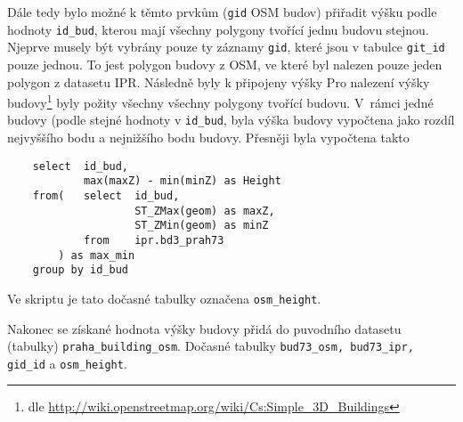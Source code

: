 Dále tedy bylo možné k těmto prvkům ({\tt gid} OSM budov) přiřadit výšku podle hodnoty {\tt id\_bud},
kterou mají všechny polygony tvořící jednu budovu stejnou.
Njeprve musely být vybrány pouze ty záznamy {\tt gid},
které jsou v tabulce {\tt git\_id} pouze jednou.
To jest polygon budovy z OSM, ve které byl nalezen pouze jeden polygon z datasetu IPR.
Následně byly k připojeny výšky
Pro nalezení výšky budovy\footnote{dle \url{http://wiki.openstreetmap.org/wiki/Cs:Simple_3D_Buildings}}
byly požity všechny všechny polygony tvořící budovu.
V~rámci jedné budovy (podle stejné hodnoty v {\tt id\_bud}, byla výška budovy vypočtena
jako rozdíl nejvyššího bodu a nejnižšího bodu budovy.
Přesněji byla vypočtena takto
\begin{verbatim}
    select	id_bud,
            max(maxZ) - min(minZ) as Height
    from(   select	id_bud,
                    ST_ZMax(geom) as maxZ,
                    ST_ZMin(geom) as minZ
            from    ipr.bd3_prah73
        ) as max_min
    group by id_bud
\end{verbatim}
Ve skriptu je tato dočasné tabulky označena {\tt osm\_height}.

Nakonec se získané hodnota výšky budovy přidá do puvodního datasetu (tabulky)
{\tt praha\_building\_osm}. Dočasné tabulky {\tt bud73\_osm, bud73\_ipr, gid\_id}
a {\tt osm\_height}.






